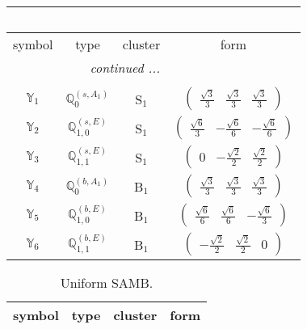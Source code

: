 \documentclass[fleqn,10pt,landscape]{article}
\begin{document}
\begin{itemize}
\begin{center}
\begin{longtable}{c|c|c|c}
\multicolumn{3}{l}{\tablename\ \thetable{}} \\
 \hline \hline
symbol & type & cluster & form \\ \hline \endhead

 \hline \hline
\multicolumn{3}{r}{\footnotesize\it continued ...} \\ \endfoot

 \hline \hline
\multicolumn{3}{r}{} \\ \endlastfoot

$ \mathbb{Y}_{1} $ & $\mathbb{Q}_{0}^{(s,A_{1})}$ & S$_{1}$ & $\begin{pmatrix} \frac{\sqrt{3}}{3} & \frac{\sqrt{3}}{3} & \frac{\sqrt{3}}{3} \end{pmatrix}$ \\
$ \mathbb{Y}_{2} $ & $\mathbb{Q}_{1,0}^{(s,E)}$ & S$_{1}$ & $\begin{pmatrix} \frac{\sqrt{6}}{3} & - \frac{\sqrt{6}}{6} & - \frac{\sqrt{6}}{6} \end{pmatrix}$ \\
$ \mathbb{Y}_{3} $ & $\mathbb{Q}_{1,1}^{(s,E)}$ & S$_{1}$ & $\begin{pmatrix} 0 & - \frac{\sqrt{2}}{2} & \frac{\sqrt{2}}{2} \end{pmatrix}$ \\ \hline
$ \mathbb{Y}_{4} $ & $\mathbb{Q}_{0}^{(b,A_{1})}$ & B$_{1}$ & $\begin{pmatrix} \frac{\sqrt{3}}{3} & \frac{\sqrt{3}}{3} & \frac{\sqrt{3}}{3} \end{pmatrix}$ \\
$ \mathbb{Y}_{5} $ & $\mathbb{Q}_{1,0}^{(b,E)}$ & B$_{1}$ & $\begin{pmatrix} \frac{\sqrt{6}}{6} & \frac{\sqrt{6}}{6} & - \frac{\sqrt{6}}{3} \end{pmatrix}$ \\
$ \mathbb{Y}_{6} $ & $\mathbb{Q}_{1,1}^{(b,E)}$ & B$_{1}$ & $\begin{pmatrix} - \frac{\sqrt{2}}{2} & \frac{\sqrt{2}}{2} & 0 \end{pmatrix}$ \\
\end{longtable}
\end{center}
\begin{center}
\renewcommand{\arraystretch}{1.3}
\begin{longtable}{c|c|c|c}
\caption{Uniform SAMB.}
 \\
 \hline \hline
symbol & type & cluster & form \\ \hline \endfirsthead


\end{longtable}
\end{center}
\end{itemize}
\end{document}
